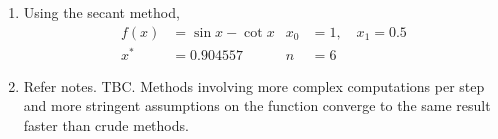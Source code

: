 \begin{enumerate}
    \item Using the secant method,
          \begin{align}
              f(x) & = \sin x - \cot x    &
              x_0  & = 1, \quad x_1 = 0.5   \\
              x^*  & = 0.904557           &
              n    & = 6
          \end{align}

    \item Refer notes. TBC.
          Methods involving more complex computations per step and more stringent
          assumptions on the function converge to the same result faster than crude
          methods.
\end{enumerate}